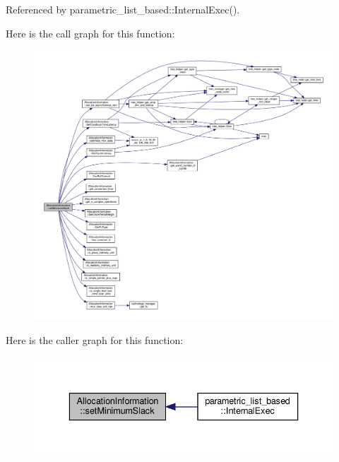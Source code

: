 Referenced by parametric\+\_\+list\+\_\+based\+::\+Internal\+Exec().

Here is the call graph for this function\+:
\nopagebreak
\begin{figure}[H]
\begin{center}
\leavevmode
\includegraphics[width=350pt]{d7/d79/classAllocationInformation_a84649ecfe63d3cca639663ab1a01fc91_cgraph}
\end{center}
\end{figure}
Here is the caller graph for this function\+:
\nopagebreak
\begin{figure}[H]
\begin{center}
\leavevmode
\includegraphics[width=336pt]{d7/d79/classAllocationInformation_a84649ecfe63d3cca639663ab1a01fc91_icgraph}
\end{center}
\end{figure}
\mbox{\label{classAllocationInformation_a30a7b6425810143360160ce414f96e58}} 
